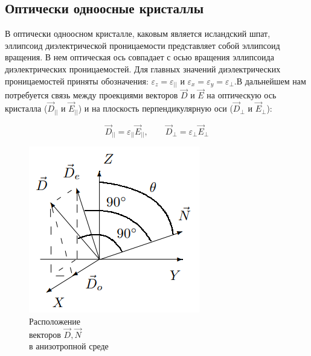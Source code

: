 \documentclass[a4paper,12pt]{article}
\begin{document}
\subsection*{Оптически одноосные кристаллы}

В оптически одноосном кристалле,
каковым является исландский шпат, эллипсоид диэлектрической проницаемости представляет собой эллипсоид вращения. В нем оптическая ось совпадает с осью вращения эллипсоида диэлектрических проницаемостей. Для главных значений диэлектрических проницаемостей приняты обозначения: $\varepsilon_z = \varepsilon_{||}$ и $\varepsilon_x = \varepsilon_y = \varepsilon_{\perp}$.В дальнейшем нам потребуется связь между проекциями векторов $\vec{D}$ и $\vec{E}$ на оптическую ось кристалла ($\vec{D}_{||}$ и $\vec{E}_{||}$) и на плоскость перпендикулярную оси ($\vec{D}_{\perp}$ и $\vec{E}_{\perp}$):

\begin{equation}
\vec{D}_{||} = \varepsilon_{||} \vec{E}_{||}, \qquad \vec{D}_{\perp} = \varepsilon_{\perp} \vec{E}_{\perp}
\end{equation}

\begin{figure} 
	\includegraphics[width=\linewidth]{fig2}
	\caption{Расположение \\ векторов $\vec{D} , \vec{N}$ \\ в анизотропной среде}
\end{figure}
\end{document}
